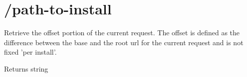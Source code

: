 \hypertarget{_2path-to-install-example}{\section{/path-\/to-\/install}
}
Retrieve the offset portion of the current request. The offset is defined as the difference between the base and the root url for the current request and is not fixed 'per install'.

\begin{DoxyReturn}{Returns}
string
\end{DoxyReturn}

\begin{DoxyCodeInclude}
\end{DoxyCodeInclude}
 